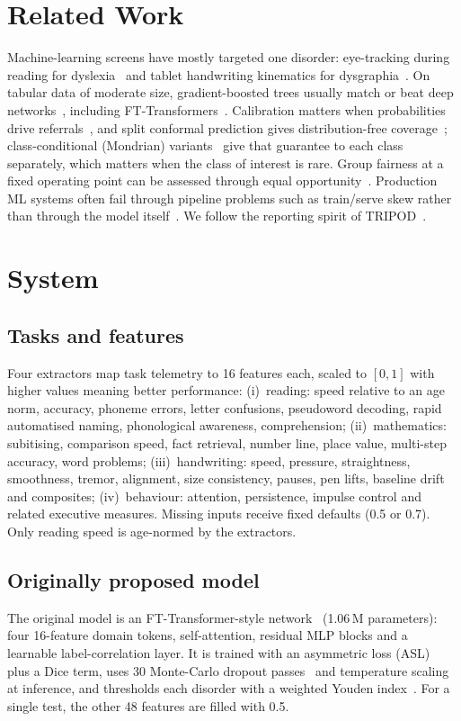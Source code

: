 \documentclass[conference]{IEEEtran}
\begin{document}
\section{Related Work}
Machine-learning screens have mostly targeted one disorder: eye-tracking during
reading for dyslexia~\cite{rello2015} and tablet handwriting kinematics for
dysgraphia~\cite{asselborn2018}. On tabular data of moderate size, gradient-boosted
trees usually match or beat deep networks~\cite{grinsztajn2022}, including
FT-Transformers~\cite{gorishniy2021}. Calibration matters when probabilities drive
referrals~\cite{guo2017}, and split conformal prediction gives distribution-free
coverage~\cite{angelopoulos2021}; class-conditional (Mondrian)
variants~\cite{vovk2005} give that guarantee to each class separately, which matters
when the class of interest is rare. Group fairness at a fixed operating point can be
assessed through equal opportunity~\cite{hardt2016}. Production ML systems often
fail through pipeline problems such as train/serve skew rather than through the
model itself~\cite{sculley2015}. We follow the reporting spirit of
TRIPOD~\cite{collins2015}.

\section{System}
\subsection{Tasks and features}
Four extractors map task telemetry to 16 features each, scaled to $[0,1]$ with higher
values meaning better performance:
(i)~reading: speed relative to an age norm, accuracy, phoneme errors, letter
confusions, pseudoword decoding, rapid automatised naming, phonological awareness,
comprehension;
(ii)~mathematics: subitising, comparison speed, fact retrieval, number line, place
value, multi-step accuracy, word problems;
(iii)~handwriting: speed, pressure, straightness, smoothness, tremor, alignment, size
consistency, pauses, pen lifts, baseline drift and composites;
(iv)~behaviour: attention, persistence, impulse control and related executive
measures. Missing inputs receive fixed defaults (0.5 or 0.7). Only reading speed is
age-normed by the extractors.

\subsection{Originally proposed model}
The original model is an FT-Transformer-style network~\cite{gorishniy2021} (1.06\,M
parameters): four 16-feature domain tokens, self-attention, residual MLP blocks and
a learnable label-correlation layer. It is trained with an asymmetric loss
(ASL)~\cite{benbaruch2021} plus a Dice term, uses 30 Monte-Carlo dropout
passes~\cite{gal2016} and temperature scaling~\cite{guo2017} at inference, and
thresholds each disorder with a weighted Youden index~\cite{youden1950}. For a single
test, the other 48 features are filled with 0.5.
\end{document}
